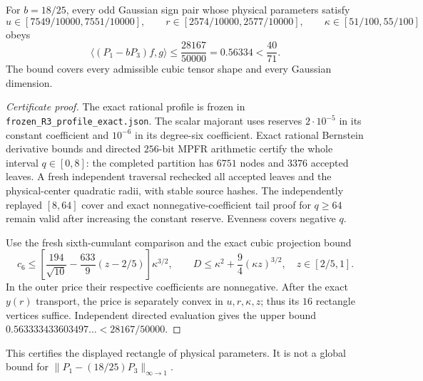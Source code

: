 \begin{proposition}
\label{prop:r3-certified-rectangle}
For $b=18/25$, every odd Gaussian sign pair whose physical parameters satisfy
\[
 u\in[7549/10000,7551/10000],\qquad
 r\in[2574/10000,2577/10000],\qquad
 \kappa\in[51/100,55/100]
\]
obeys
\[
 \langle(P_1-bP_3)f,g\rangle\leq\frac{28167}{50000}
 =0.56334<\frac{40}{71}.
\]
The bound covers every admissible cubic tensor shape and every Gaussian
dimension.
\end{proposition}
\begin{proof}[Certificate proof]
The exact rational profile is frozen in
\texttt{frozen\_R3\_profile\_exact.json}.  The scalar majorant uses reserves
$2\cdot10^{-5}$ in its constant coefficient and $10^{-6}$ in its
degree-six coefficient.  Exact rational Bernstein derivative bounds and
directed $256$-bit MPFR arithmetic certify the whole interval $q\in[0,8]$:
the completed partition has $6751$ nodes and $3376$ accepted leaves.
A fresh independent traversal rechecked all accepted leaves and the
physical-center quadratic radii, with stable source hashes.
The independently replayed $[8,64]$ cover and exact nonnegative-coefficient
tail proof for $q\geq64$ remain valid after increasing the constant reserve.
Evenness covers negative $q$.

Use the fresh sixth-cumulant comparison and the exact cubic projection bound
\[
 c_6\leq\left[\frac{194}{\sqrt{10}}
              -\frac{633}{9}(z-2/5)\right]\kappa^{3/2},\qquad
 D\leq\kappa^2+\frac94(\kappa z)^{3/2},\quad z\in[2/5,1].
\]
In the outer price their respective coefficients are nonnegative.
After the exact $y(r)$ transport, the price is separately convex in
$u,r,\kappa,z$; thus its $16$ rectangle vertices suffice.
Independent directed evaluation gives the upper bound
$0.563333433603497\ldots<28167/50000$.
\end{proof}
This certifies the displayed rectangle of physical parameters.  It is not
a global bound for $\|P_1-(18/25)P_3\|_{\infty\to1}$.
